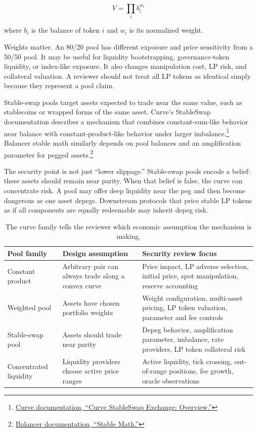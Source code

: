 \[
    V = \prod_i b_i^{w_i}
\]

where \(b_i\) is the balance of token \(i\) and \(w_i\) is its normalized weight.

Weights matter. An 80/20 pool has different exposure and price sensitivity from a 50/50 pool. It may be useful for liquidity bootstrapping, governance-token liquidity, or index-like exposure. It also changes manipulation cost, LP risk, and collateral valuation. A reviewer should not treat all LP tokens as identical simply because they represent a pool claim.

Stable-swap pools target assets expected to trade near the same value, such as stablecoins or wrapped forms of the same asset. Curve's StableSwap documentation describes a mechanism that combines constant-sum-like behavior near balance with constant-product-like behavior under larger imbalance.\footnote{\href{https://docs.curve.finance/developer/amm/legacy/stableswap-overview}{Curve documentation, ``Curve StableSwap Exchange: Overview.''}} Balancer stable math similarly depends on pool balances and an amplification parameter for pegged assets.\footnote{\href{https://docs.balancer.fi/concepts/explore-available-balancer-pools/stable-pool/stable-math.html}{Balancer documentation, ``Stable Math.''}}

The security point is not just ``lower slippage.'' Stable-swap pools encode a belief: these assets should remain near parity. When that belief is false, the curve can concentrate risk. A pool may offer deep liquidity near the peg and then become dangerous as one asset depegs. Downstream protocols that price stable LP tokens as if all components are equally redeemable may inherit depeg risk.

\begin{table}[htbp]
\centering
\small
\renewcommand{\arraystretch}{1.16}
\begin{tabularx}{\textwidth}{@{}>{\RaggedRight\arraybackslash}p{}>{\RaggedRight\arraybackslash}p{}>{\RaggedRight\arraybackslash}X@{}}
\toprule
Pool family & Design assumption & Security review focus \\
\midrule
Constant product & Arbitrary pair can always trade along a convex curve & Price impact, LP adverse selection, initial price, spot manipulation, reserve accounting \\
Weighted pool & Assets have chosen portfolio weights & Weight configuration, multi-asset pricing, LP token valuation, parameter and fee controls \\
Stable-swap pool & Assets should trade near parity & Depeg behavior, amplification parameter, imbalance, rate providers, LP token collateral risk \\
Concentrated liquidity & Liquidity providers choose active price ranges & Active liquidity, tick crossing, out-of-range positions, fee growth, oracle observations \\
\bottomrule
\end{tabularx}
\caption{The curve family tells the reviewer which economic assumption the mechanism is making.}
\end{table}

